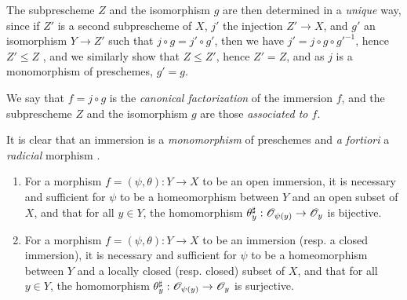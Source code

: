 The subprescheme $Z$ and the isomorphism $g$ are then determined in a \emph{unique} way, since if $Z'$ is a second subprescheme of $X$, $j'$ the injection $Z'\to X$, and $g'$ an isomorphism $Y\to Z'$ such that $j\circ g=j'\circ g'$, then we have $j'=j\circ g\circ{g'}^{-1}$, hence $Z'\leqslant Z$ , and we similarly show that $Z\leqslant Z'$, hence $Z'=Z$, and as $j$ is a monomorphism of preschemes, $g'=g$.

We say that $f=j\circ g$ is the \emph{canonical factorization} of the immersion $f$, and the subprescheme $Z$ and the isomorphism $g$ are those \emph{associated to $f$}.

It is clear that an immersion is a \emph{monomorphism} of preschemes  and \emph{a fortiori} a \emph{radicial} morphism .

\begin{prop}[4.2.2]
\label{1.4.2.2}
\medskip\noindent
\begin{enumerate}[label={\rm(\alph*)}]
  \item For a morphism $f=(\psi,\theta):Y\to X$ to be an open immersion, it is necessary and sufficient for $\psi$ to be a homeomorphism between $Y$ and an open subset of $X$, and that for all $y\in Y$, the homomorphism $\theta_y^\sharp:\OO_{\psi(y)}\to\OO_y$ is bijective.
  \item For a morphism $f=(\psi,\theta):Y\to X$ to be an immersion (resp. a closed immersion), it is necessary and sufficient for $\psi$ to be a homeomorphism between $Y$ and a locally closed (resp. closed) subset of $X$, and that for all $y\in Y$, the homomorphism $\theta_y^\sharp:\OO_{\psi(y)}\to\OO_y$ is surjective.
\end{enumerate}
\end{prop}

